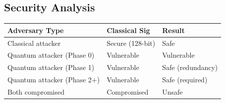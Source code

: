 \subsection{Security Analysis}

\begin{table}[h]
\centering
\begin{tabular}{@{}lll@{}}
\toprule
\textbf{Adversary Type} & \textbf{Classical Sig} & \textbf{Result} \\
\midrule
Classical attacker & Secure (128-bit) & Safe \\
Quantum attacker (Phase 0) & Vulnerable & Vulnerable \\
Quantum attacker (Phase 1) & Vulnerable & Safe (redundancy) \\
Quantum attacker (Phase 2+) & Vulnerable & Safe (required) \\
Both compromised & Compromised & Unsafe \\
\bottomrule
\end{tabular}

\label{tab:dual-sig-security}
\end{table}

